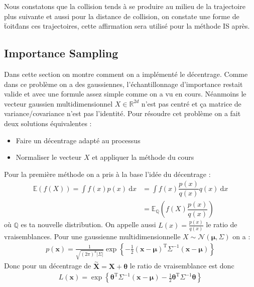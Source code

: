 \documentclass[a4paper, 12pt,twoside]{article}
\numberwithin{equation}{subsection}
\begin{document}
	Nous constatons que la collision tends à se produire au milieu de la trajectoire plus suivante et aussi pour la distance de collision, on constate une forme de \"toit\" dans ces trajectoires, cette affirmation sera utilisé pour la méthode IS après.
	
	
	\subsection{Importance Sampling} %
	\label{sub:importance_sampling}
	
	Dans cette section on montre comment on a implémenté le décentrage. Comme dans ce problème on a des gaussiennes, l'échantillonnage d'importance restait valide et avec une formule assez simple comme on a vu en cours. Néanmoins le vecteur gaussien multidimensionnel $X\in \mathbb{R}^{2d}$ n'est pas centré et ça matrice de variance/covariance n'est pas l'identité. Pour résoudre cet problème on a fait deux solutions équivalentes : 
	\begin{itemize}
		\item Faire un décentrage adapté au processus
		\item Normaliser le vecteur $X$ et appliquer la méthode du cours
	\end{itemize}
	Pour la première méthode on a pris à la base l'idée du décentrage :
	\begin{align}
		\mathbb{E}(f(X)) = \int f(x)p(x)~\mathrm{d}x &= \int f(x)\dfrac{p(x)}{q(x)}q(x)~\mathrm{d}x \nonumber \\
		&= \mathbb{E}_{\mathbb{Q}}(f(X)\dfrac{p(x)}{q(x)})
	\end{align}
	où $\mathbb{Q}$ es ta nouvelle distribution. On appelle aussi $L(x)=\frac{p(x)}{q(x)}$ le ratio de vraisemblances. Pour une gaussienne multidimensionnelle $X \sim \mathcal{N}(\boldsymbol\mu, \Sigma)$ on a : 
	\begin{align}
		p(\boldsymbol x) =
		\frac{1}{\sqrt{(2\pi)^{k}|\Sigma|}}
		\exp\left \{ -\frac{1}{2}({\mathbf x}-{\boldsymbol\mu})^\mathrm{T}{\Sigma}^{-1}({\mathbf x}-{\boldsymbol\mu})
		\right \}
	\end{align}
	Donc pour un décentrage de $\overset{\sim}{\boldsymbol X}=\boldsymbol X+ \boldsymbol \theta$ le ratio de vraisemblance est donc 
	\begin{align}
		L(\boldsymbol x) = \exp\left \{
		\boldsymbol\theta^\mathrm{T}{\Sigma}^{-1}({\mathbf x}-{\boldsymbol\mu})
		-\frac{1}{2}\boldsymbol\theta^\mathrm{T}{\Sigma}^{-1}\boldsymbol\theta
		\right \}
	\end{align}
	
\end{document}
